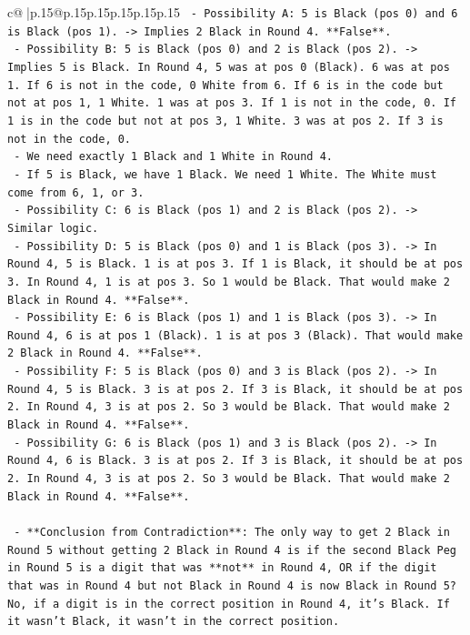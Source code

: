 \documentclass{article}
\begin{document}
{\begin{supertabular}{c@{$\;$}|p{.15\linewidth}@{}p{.15\linewidth}p{.15\linewidth}p{.15\linewidth}p{.15\linewidth}p{.15\linewidth}}
{{{\texttt{        {-} Possibility A: 5 is Black (pos 0) and 6 is Black (pos 1). {-}> Implies 2 Black in Round 4. **False**.} \\
\texttt{        {-} Possibility B: 5 is Black (pos 0) and 2 is Black (pos 2). {-}> Implies 5 is Black. In Round 4, 5 was at pos 0 (Black). 6 was at pos 1. If 6 is not in the code, 0 White from 6. If 6 is in the code but not at pos 1, 1 White. 1 was at pos 3. If 1 is not in the code, 0. If 1 is in the code but not at pos 3, 1 White. 3 was at pos 2. If 3 is not in the code, 0.} \\
\texttt{            {-} We need exactly 1 Black and 1 White in Round 4.} \\
\texttt{            {-} If 5 is Black, we have 1 Black. We need 1 White. The White must come from 6, 1, or 3.} \\
\texttt{        {-} Possibility C: 6 is Black (pos 1) and 2 is Black (pos 2). {-}> Similar logic.} \\
\texttt{        {-} Possibility D: 5 is Black (pos 0) and 1 is Black (pos 3). {-}> In Round 4, 5 is Black. 1 is at pos 3. If 1 is Black, it should be at pos 3. In Round 4, 1 is at pos 3. So 1 would be Black. That would make 2 Black in Round 4. **False**.} \\
\texttt{        {-} Possibility E: 6 is Black (pos 1) and 1 is Black (pos 3). {-}> In Round 4, 6 is at pos 1 (Black). 1 is at pos 3 (Black). That would make 2 Black in Round 4. **False**.} \\
\texttt{        {-} Possibility F: 5 is Black (pos 0) and 3 is Black (pos 2). {-}> In Round 4, 5 is Black. 3 is at pos 2. If 3 is Black, it should be at pos 2. In Round 4, 3 is at pos 2. So 3 would be Black. That would make 2 Black in Round 4. **False**.} \\
\texttt{        {-} Possibility G: 6 is Black (pos 1) and 3 is Black (pos 2). {-}> In Round 4, 6 is Black. 3 is at pos 2. If 3 is Black, it should be at pos 2. In Round 4, 3 is at pos 2. So 3 would be Black. That would make 2 Black in Round 4. **False**.} \\
\\ 
\texttt{    {-} **Conclusion from Contradiction**: The only way to get 2 Black in Round 5 without getting 2 Black in Round 4 is if the second Black Peg in Round 5 is a digit that was **not** in Round 4, OR if the digit that was in Round 4 but not Black in Round 4 is now Black in Round 5? No, if a digit is in the correct position in Round 4, it's Black. If it wasn't Black, it wasn't in the correct position.} \\
}}}
\end{supertabular}}
\end{document}
